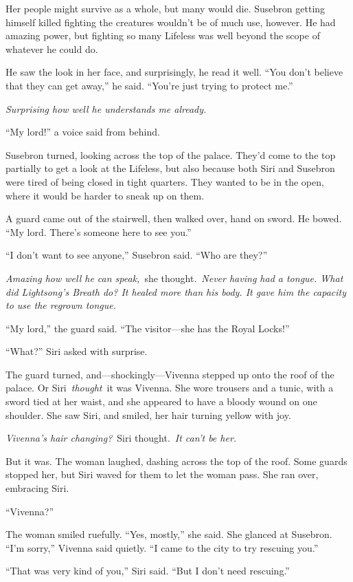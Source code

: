 Her people might survive as a whole, but many would die. Susebron getting himself killed fighting the creatures wouldn’t be of much use, however. He had amazing power, but fighting so many Lifeless was well beyond the scope of whatever he could do.

He saw the look in her face, and surprisingly, he read it well. “You don’t believe that they can get away,” he said. “You’re just trying to protect me.”

\textit{Surprising how well he understands me already.}

“My lord!” a voice said from behind.

Susebron turned, looking across the top of the palace. They’d come to the top partially to get a look at the Lifeless, but also because both Siri and Susebron were tired of being closed in tight quarters. They wanted to be in the open, where it would be harder to sneak up on them.

A guard came out of the stairwell, then walked over, hand on sword. He bowed. “My lord. There’s someone here to see you.”

“I don’t want to see anyone,” Susebron said. “Who are they?”

\textit{Amazing how well he can speak,}~she thought.~\textit{Never having had a tongue. What did Lightsong’s Breath do? It healed more than his body. It gave him the capacity to use the regrown tongue.}

“My lord,” the guard said. “The visitor—she has the Royal Locks!”

“What?” Siri asked with surprise.

The guard turned, and—shockingly—Vivenna stepped up onto the roof of the palace. Or Siri~\textit{thought}~it was Vivenna. She wore trousers and a tunic, with a sword tied at her waist, and she appeared to have a bloody wound on one shoulder. She saw Siri, and smiled, her hair turning yellow with joy.

\textit{Vivenna’s hair changing?}~Siri thought.~\textit{It can’t be her.}

But it was. The woman laughed, dashing across the top of the roof. Some guards stopped her, but Siri waved for them to let the woman pass. She ran over, embracing Siri.

“Vivenna?”

The woman smiled ruefully. “Yes, mostly,” she said. She glanced at Susebron. “I’m sorry,” Vivenna said quietly. “I came to the city to try rescuing you.”

“That was very kind of you,” Siri said. “But I don’t need rescuing.”

